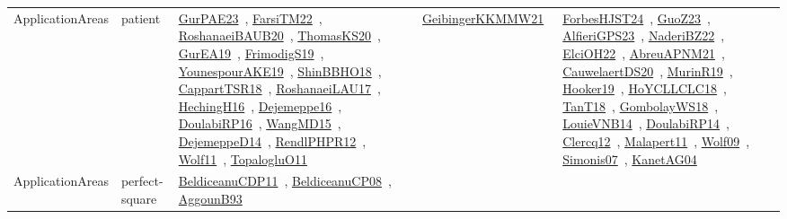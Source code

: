 {\begin{longtable}{lp{3cm}>{\raggedright\arraybackslash}p{6cm}>{\raggedright\arraybackslash}p{6cm}>{\raggedright\arraybackslash}p{8cm}}
ApplicationAreas & patient & \href{works/GurPAE23.pdf}{GurPAE23}~\cite{GurPAE23}, \href{works/FarsiTM22.pdf}{FarsiTM22}~\cite{FarsiTM22}, \href{works/RoshanaeiBAUB20.pdf}{RoshanaeiBAUB20}~\cite{RoshanaeiBAUB20}, \href{works/ThomasKS20.pdf}{ThomasKS20}~\cite{ThomasKS20}, \href{works/GurEA19.pdf}{GurEA19}~\cite{GurEA19}, \href{works/FrimodigS19.pdf}{FrimodigS19}~\cite{FrimodigS19}, \href{works/YounespourAKE19.pdf}{YounespourAKE19}~\cite{YounespourAKE19}, \href{works/ShinBBHO18.pdf}{ShinBBHO18}~\cite{ShinBBHO18}, \href{works/CappartTSR18.pdf}{CappartTSR18}~\cite{CappartTSR18}, \href{works/RoshanaeiLAU17.pdf}{RoshanaeiLAU17}~\cite{RoshanaeiLAU17}, \href{works/HechingH16.pdf}{HechingH16}~\cite{HechingH16}, \href{works/Dejemeppe16.pdf}{Dejemeppe16}~\cite{Dejemeppe16}, \href{works/DoulabiRP16.pdf}{DoulabiRP16}~\cite{DoulabiRP16}, \href{works/WangMD15.pdf}{WangMD15}~\cite{WangMD15}, \href{works/DejemeppeD14.pdf}{DejemeppeD14}~\cite{DejemeppeD14}, \href{works/RendlPHPR12.pdf}{RendlPHPR12}~\cite{RendlPHPR12}, \href{works/Wolf11.pdf}{Wolf11}~\cite{Wolf11}, \href{works/TopalogluO11.pdf}{TopalogluO11}~\cite{TopalogluO11} & \href{works/GeibingerKKMMW21.pdf}{GeibingerKKMMW21}~\cite{GeibingerKKMMW21} & \href{works/ForbesHJST24.pdf}{ForbesHJST24}~\cite{ForbesHJST24}, \href{works/GuoZ23.pdf}{GuoZ23}~\cite{GuoZ23}, \href{works/AlfieriGPS23.pdf}{AlfieriGPS23}~\cite{AlfieriGPS23}, \href{works/NaderiBZ22.pdf}{NaderiBZ22}~\cite{NaderiBZ22}, \href{works/ElciOH22.pdf}{ElciOH22}~\cite{ElciOH22}, \href{works/AbreuAPNM21.pdf}{AbreuAPNM21}~\cite{AbreuAPNM21}, \href{works/CauwelaertDS20.pdf}{CauwelaertDS20}~\cite{CauwelaertDS20}, \href{works/MurinR19.pdf}{MurinR19}~\cite{MurinR19}, \href{works/Hooker19.pdf}{Hooker19}~\cite{Hooker19}, \href{works/HoYCLLCLC18.pdf}{HoYCLLCLC18}~\cite{HoYCLLCLC18}, \href{works/TanT18.pdf}{TanT18}~\cite{TanT18}, \href{works/GombolayWS18.pdf}{GombolayWS18}~\cite{GombolayWS18}, \href{works/LouieVNB14.pdf}{LouieVNB14}~\cite{LouieVNB14}, \href{works/DoulabiRP14.pdf}{DoulabiRP14}~\cite{DoulabiRP14}, \href{works/Clercq12.pdf}{Clercq12}~\cite{Clercq12}, \href{works/Malapert11.pdf}{Malapert11}~\cite{Malapert11}, \href{works/Wolf09.pdf}{Wolf09}~\cite{Wolf09}, \href{works/Simonis07.pdf}{Simonis07}~\cite{Simonis07}, \href{works/KanetAG04.pdf}{KanetAG04}~\cite{KanetAG04}\\
ApplicationAreas & perfect-square & \href{works/BeldiceanuCDP11.pdf}{BeldiceanuCDP11}~\cite{BeldiceanuCDP11}, \href{works/BeldiceanuCP08.pdf}{BeldiceanuCP08}~\cite{BeldiceanuCP08}, \href{works/AggounB93.pdf}{AggounB93}~\cite{AggounB93} &  & \\

\end{longtable}}
